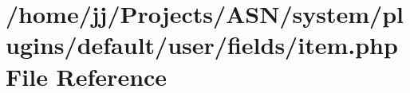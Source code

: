 \hypertarget{system_2plugins_2default_2user_2fields_2item_8php}{}\section{/home/jj/\+Projects/\+A\+S\+N/system/plugins/default/user/fields/item.php File Reference}
\label{system_2plugins_2default_2user_2fields_2item_8php}
